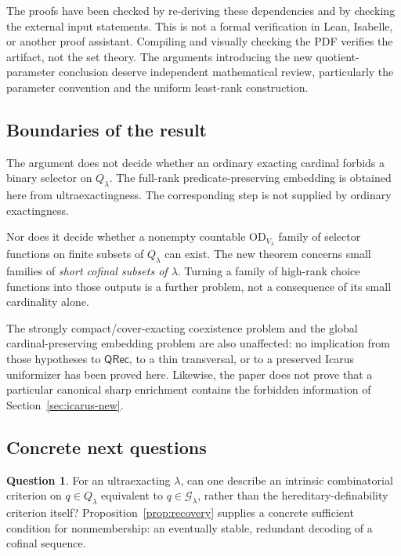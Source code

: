 \documentclass[11pt,letterpaper]{article}
\theoremstyle{definition}
\newtheorem{question}[definition]{Question}
\numberwithin{equation}{section}
\newcommand{\OD}{\mathrm{OD}}
\newcommand{\Qlam}{Q_\lambda}
\newcommand{\Good}{\mathcal G_\lambda}
\newcommand{\QRec}{\mathsf{QRec}}
\begin{document}
The proofs have been checked by re-deriving these dependencies and by checking the external input statements. This is not a formal verification in Lean, Isabelle, or another proof assistant. Compiling and visually checking the PDF verifies the artifact, not the set theory. The arguments introducing the new quotient-parameter conclusion deserve independent mathematical review, particularly the parameter convention and the uniform least-rank construction.

\subsection{Boundaries of the result}

The argument does not decide whether an ordinary exacting cardinal forbids a binary selector on $\Qlam$. The full-rank predicate-preserving embedding is obtained here from ultraexactingness. The corresponding step is not supplied by ordinary exactingness.

Nor does it decide whether a nonempty countable $\OD_{V_\lambda}$ family of selector functions on finite subsets of $\Qlam$ can exist. The new theorem concerns small families of \emph{short cofinal subsets of $\lambda$}. Turning a family of high-rank choice functions into those outputs is a further problem, not a consequence of its small cardinality alone.

The strongly compact/cover-exacting coexistence problem and the global cardinal-preserving embedding problem are also unaffected: no implication from those hypotheses to $\QRec$, to a thin transversal, or to a preserved Icarus uniformizer has been proved here. Likewise, the paper does not prove that a particular canonical sharp enrichment contains the forbidden information of Section~\ref{sec:icarus-new}.

\subsection{Concrete next questions}

\begin{question}
For an ultraexacting $\lambda$, can one describe an intrinsic combinatorial criterion on $q\in\Qlam$ equivalent to $q\in\Good$, rather than the hereditary-definability criterion itself? Proposition~\ref{prop:recovery} supplies a concrete sufficient condition for nonmembership: an eventually stable, redundant decoding of a cofinal sequence.
\end{question}
\end{document}
